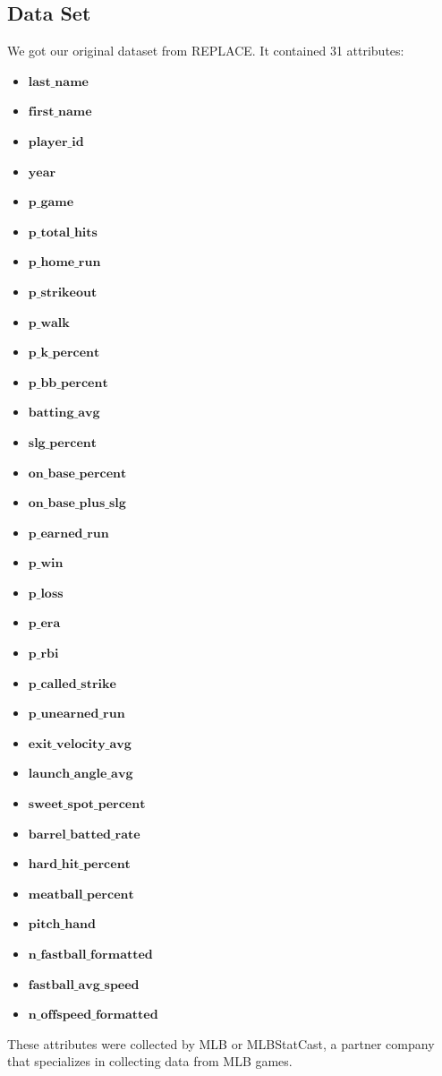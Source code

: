 \documentclass[12pt]{article}
\begin{document}
\subsection{Data Set}
We got our original dataset from REPLACE. It contained 31 attributes: 
\begin{itemize}
    \item $\textbf{last\_name}$
    \item $\textbf{first\_name}$
    \item $\textbf{player\_id}$
    \item $\textbf{year}$
    \item $\textbf{p\_game}$
    \item $\textbf{p\_total\_hits}$
    \item $\textbf{p\_home\_run}$
    \item $\textbf{p\_strikeout}$
    \item $\textbf{p\_walk}$
    \item $\textbf{p\_k\_percent}$
    \item $\textbf{p\_bb\_percent}$
    \item $\textbf{batting\_avg}$
    \item $\textbf{slg\_percent}$
    \item $\textbf{on\_base\_percent}$
    \item $\textbf{on\_base\_plus\_slg}$
    \item $\textbf{p\_earned\_run}$
    \item $\textbf{p\_win}$
    \item $\textbf{p\_loss}$
    \item $\textbf{p\_era}$
    \item $\textbf{p\_rbi}$
    \item $\textbf{p\_called\_strike}$
    \item $\textbf{p\_unearned\_run}$
    \item $\textbf{exit\_velocity\_avg}$
    \item $\textbf{launch\_angle\_avg}$
    \item $\textbf{sweet\_spot\_percent}$
    \item $\textbf{barrel\_batted\_rate}$
    \item $\textbf{hard\_hit\_percent}$
    \item $\textbf{meatball\_percent}$
    \item $\textbf{pitch\_hand}$
    \item $\textbf{n\_fastball\_formatted}$
    \item $\textbf{fastball\_avg\_speed}$
    \item $\textbf{n\_offspeed\_formatted}$
\end{itemize}
These attributes were collected by MLB or MLBStatCast, a partner company that specializes in collecting data from MLB games.  
\end{document}
